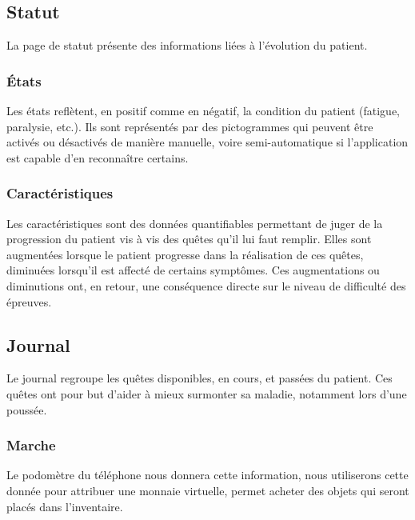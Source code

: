 \documentclass[a4paper,12pt,francais]{article}
\begin{document}
\subsection{Statut}
La page de statut présente des informations liées à l'évolution du patient.
\subsubsection{États}
Les états reflètent, en positif comme en négatif, la condition du patient (fatigue, paralysie, etc.). Ils sont représentés par des pictogrammes qui peuvent être activés ou désactivés de manière manuelle, voire semi-automatique si l'application est capable d'en reconnaître certains.
\subsubsection{Caractéristiques}
Les caractéristiques sont des données quantifiables permettant de juger de la progression du patient vis à vis des quêtes qu'il lui faut remplir. Elles sont augmentées lorsque le patient progresse dans la réalisation de ces quêtes, diminuées lorsqu'il est affecté de certains symptômes. Ces augmentations ou diminutions ont, en retour, une conséquence directe sur le niveau de difficulté des épreuves.
\subsection{Journal}
Le journal regroupe les quêtes disponibles, en cours, et passées du patient. Ces quêtes ont pour but d'aider à mieux surmonter sa maladie, notamment lors d'une poussée.
\subsubsection{Marche}
Le podomètre du téléphone nous donnera cette information, nous utiliserons cette donnée pour attribuer une monnaie virtuelle, permet acheter des objets qui seront placés dans l'inventaire.
\end{document}
